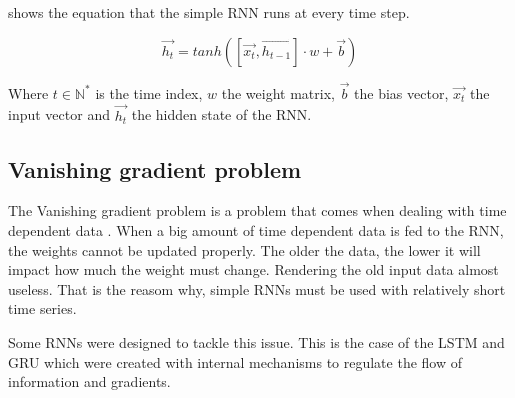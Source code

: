  shows the equation that the simple \ac{RNN} runs at every time step.

\begin{equation}\label{eq:srnn}
  \overrightarrow{h_t}=tanh([\overrightarrow{x_t},\overrightarrow{h_{t-1}}]\cdot w + \overrightarrow{b})
\end{equation}

Where $t\in\mathbb{N}^*$ is the time index, $w$ the weight matrix, $\overrightarrow{b}$ the bias vector, $\overrightarrow{x_t}$ the input vector and $\overrightarrow{h_{t}}$ the hidden state of the \ac{RNN}.

\subsection{Vanishing gradient problem}

The Vanishing gradient problem is a problem that comes when dealing with time dependent data \cite{vanishGrad}. When a big amount of time dependent data is fed to the \ac{RNN}, the weights cannot be updated properly. The older the data, the lower it will impact how much the weight must change. Rendering the old input data almost useless. That is the reasom why, simple \acp{RNN} must be used with relatively short time series.

Some \acp{RNN} were designed to tackle this issue. This is the case of the \ac{LSTM} and \ac{GRU} which were created with internal mechanisms to regulate the flow of information and gradients.
